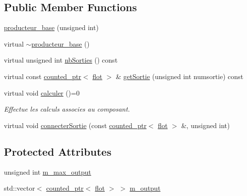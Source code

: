 \subsection*{Public Member Functions}
\begin{DoxyCompactItemize}
\item 
\hyperlink{classproducteur__base_a0c2c488d98b77585e49b98d347910025}{producteur\-\_\-base} (unsigned int)
\item 
virtual \hyperlink{classproducteur__base_adc64c1151262d68209a09dea21c1ee58}{$\sim$producteur\-\_\-base} ()
\item 
virtual unsigned int \hyperlink{classproducteur__base_ae5148ef791b0f3c393e45e08e08c6246}{nb\-Sorties} () const 
\item 
virtual const \hyperlink{classcounted__ptr}{counted\-\_\-ptr}$<$ \hyperlink{classflot}{flot} $>$ \& \hyperlink{classproducteur__base_a96c01a2773c11eb0859150fc3a8e8338}{get\-Sortie} (unsigned int numsortie) const 
\item 
virtual void \hyperlink{classproducteur__base_af1e171c9e69b0998d5124c7389737f82}{calculer} ()=0
\begin{DoxyCompactList}\small\item\em Effectue les calculs associes au composant. \end{DoxyCompactList}\item 
virtual void \hyperlink{classproducteur__base_ad24519c3b05f7371ee15a9a402dc0717}{connecter\-Sortie} (const \hyperlink{classcounted__ptr}{counted\-\_\-ptr}$<$ \hyperlink{classflot}{flot} $>$ \&, unsigned int)
\end{DoxyCompactItemize}
\subsection*{Protected Attributes}
\begin{DoxyCompactItemize}
\item 
unsigned int \hyperlink{classproducteur__base_a6439bb4131b4644839f11849568d36fc}{m\-\_\-max\-\_\-output}
\item 
std\-::vector$<$ \hyperlink{classcounted__ptr}{counted\-\_\-ptr}$<$ \hyperlink{classflot}{flot} $>$ $>$ \hyperlink{classproducteur__base_abc5c0041e6ff23ce7a5c03ee7b9daf53}{m\-\_\-output}
\end{DoxyCompactItemize}


